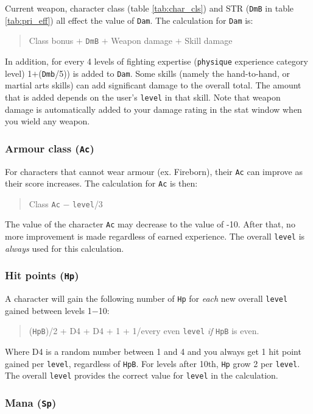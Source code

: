 Current weapon, character class
(table \ref{tab:char_cls}) and STR ({\tt DmB} in table \ref{tab:pri_eff})
all effect the value of {\tt Dam}. The calculation for {\tt Dam} is:
\begin{quote}
Class bonus $+$ {\tt DmB} $+$ Weapon damage $+$ Skill damage
\end{quote}
In addition, for every 4 levels of fighting expertise ({\tt physique}
experience category level) 1$+$({\tt Dmb}/5)) is added to {\tt Dam}.
Some skills (namely the hand-to-hand, or martial arts skills)
can add significant damage to the overall total. The amount
that is added depends on the user's {\tt level} in that skill.
Note that weapon damage is automatically added to your damage
rating in the stat window when you wield any weapon.


\subsubsection{Armour class ({\tt Ac})}

For characters that cannot wear armour (ex. Fireborn), their
{\tt Ac} can improve as their score increases. The calculation for {\tt Ac} is then:
\begin{quote}
Class {\tt Ac} $-$ {\tt level}/3
\end{quote}
The value of the character {\tt Ac} may decrease to the value of -10.
After that, no more improvement is made regardless of earned
experience. The overall {\tt level} is
{\em always} used for this calculation.


\subsubsection{Hit points ({\tt Hp})}

A character will gain the following number of {\tt Hp} for {\em each} new
overall {\tt level} gained between levels 1$-$10:
\begin{quote}
({\tt HpB})/2 + D4 + D4 + 1 + 1/every even {\tt level} {\em if} {\tt HpB} is even.
\end{quote}
Where D4 is a random number between 1 and 4 and you always get 1 hit point
gained per {\tt level}, regardless of {\tt HpB}.
For levels after 10th, {\tt Hp} grow 2 per {\tt level}.
The overall {\tt level} provides the correct value for {\tt level} in
the calculation.


\subsubsection{Mana ({\tt Sp})}

